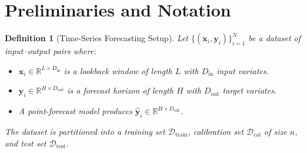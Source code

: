 \documentclass[11pt]{article}
\newtheorem{definition}[theorem]{Definition}
\newcommand{\R}{\mathbb{R}}
\newcommand{\cD}{\mathcal{D}}
\begin{document}
\section{Preliminaries and Notation}

\begin{definition}[Time-Series Forecasting Setup]
Let $\{(\mathbf{x}_i, \mathbf{y}_i)\}_{i=1}^{N}$ be a dataset of input--output pairs where:
\begin{itemize}
    \item $\mathbf{x}_i \in \R^{L \times D_{\text{in}}}$ is a lookback window of length $L$ with $D_{\text{in}}$ input variates.
    \item $\mathbf{y}_i \in \R^{H \times D_{\text{out}}}$ is a forecast horizon of length $H$ with $D_{\text{out}}$ target variates.
    \item A point-forecast model produces $\hat{\mathbf{y}}_i \in \R^{H \times D_{\text{out}}}$.
\end{itemize}
The dataset is partitioned into a \emph{training set} $\cD_{\text{train}}$, \emph{calibration set} $\cD_{\text{cal}}$ of size $n$, and \emph{test set} $\cD_{\text{test}}$.
\end{definition}
\end{document}
